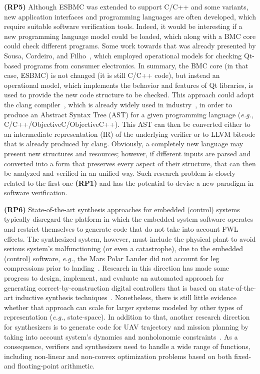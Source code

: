 \documentclass[format=acmsmall, review=false, screen=true]{acmart}
\begin{document}
{\textbf{(RP5)} Although ESBMC \cite{Cordeiro12} was extended to support C/C++ and some variants, new application interfaces and programming languages are often developed, which require suitable software verification tools. Indeed, it would be interesting if a new programming language model could be loaded, which along with a BMC core could check different programs. Some work towards that was already presented by Sousa, Cordeiro, and Filho~\cite{Garcia16}, which employed operational models for checking Qt-based programs from consumer electronics. In summary, the BMC core (in that case, ESBMC) is not changed (it is still C/C++ code), but instead an operational model, which implements the behavior and features of Qt libraries, is used to provide the new code structure to be checked. This approach could adopt the clang compiler~\cite{Lopes:2014:GSL:2692607}, which is already widely used in industry~\cite{clang-usage}, in order to produce an Abstract Syntax Tree (AST) for a given programming language ({\it e.g.}, C/C++/ObjectiveC/ObjectiveC++). This AST can then be converted either to an intermediate representation (IR) of the underlying verifier or to LLVM bitcode that is already produced by clang. Obviously, a completely new language may present new structures and resources; however, if different inputs are parsed and converted into a form that preserves every aspect of their structure, that can then be analyzed and verified in an unified way. Such research problem is closely related to the first one \textbf{(RP1)} and has the potential to devise a new paradigm in software verification.

{\textbf{(RP6)} State-of-the-art synthesis approaches for embedded (control) systems typically disregard the platform in which the embedded system software operates and restrict themselves to generate code that do not take into account FWL effects. The synthesized system, however, must include the physical plant to avoid serious system's malfunctioning (or even a catastrophe), due to the embedded (control) software, {\it e.g.}, the Mars Polar Lander did not account for leg compressions prior to landing~\cite{Jackson16}. Research in this direction has made some progress to design, implement, and evaluate an automated approach for generating correct-by-construction digital controllers that is based on state-of-the-art inductive synthesis techniques~\cite{Abate17}. Nonetheless, there is still little evidence whether that approach can scale for larger systems modeled by other types of representation ({\it e.g.}, state-space). In addition to that, another research direction for synthesizers is to generate code for UAV trajectory and mission planning by taking into account system's dynamics and nonholonomic constraints~\cite{Araujo16}. As a consequence, verifiers and synthesizers need to handle a wide range of functions, including non-linear and non-convex optimization problems based on both fixed- and floating-point arithmetic.

}}
\end{document}
